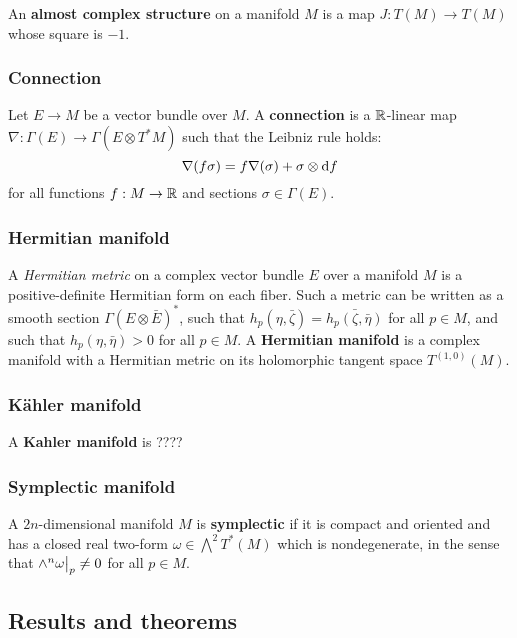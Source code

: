 \documentclass[11pt, english]{article}
\begin{document}
An \textbf{almost complex structure} on a manifold $M$ is a map $J:T(M) \to T(M)$ whose square is $-1$.

\subsubsection{Connection}
\label{connection}
Let $E \to M$ be a vector bundle over $M$. A \textbf{connection} is a $\mathbb{R}$-linear map $\nabla:\Gamma(E) \to \Gamma(E \otimes T^\ast M)$ such that the Leibniz rule holds:
\[
\nabla(f \sigma) = f \nabla(\sigma) + \sigma \otimes \mathrm{d}{f}
\]
for all functions $f:M \to \mathbb{R}$ and sections $\sigma \in \Gamma(E)$.

\subsubsection{Hermitian manifold}
\label{hermitianmanifold}

A \emph{Hermitian metric} on a complex vector bundle $E$ over a manifold $M$ is a positive-definite Hermitian form on each fiber. Such a metric can be written as a smooth section $\Gamma(E \otimes \bar{E})^\ast$, such that $h_p(\eta, \bar{\zeta}) = \bar{h_p\left(\zeta,\bar{\eta}\right)}$ for all $p \in M$, and such that $h_p(\eta,\bar{\eta}) > 0$ for all $p \in M$. A \textbf{Hermitian manifold} is a complex manifold with a Hermitian metric on its holomorphic tangent space $T^{(1,0)}(M)$.

\subsubsection{Kähler manifold}
\label{kahlermanifold}

A \textbf{Kahler manifold} is ????

\subsubsection{Symplectic manifold}
\label{symplectic}

A $2n$-dimensional manifold $M$ is \textbf{symplectic} if it is compact and oriented and has a closed real two-form $\omega \in \bigwedge^2 T^\ast(M)$ which is nondegenerate, in the sense that $\restr{\wedge^n \omega}{p} \neq 0$ for all $p \in M$.

\subsection{Results and theorems}
\end{document}
